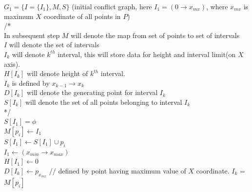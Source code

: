 \documentclass[a4paper]{article}
\begin{document}
\begin{algorithm}[H]
\SetAlgoLined
{}
  $G_1 = \{ I = \{ I_1 \}, M, S \}$ (initial conflict graph, here $I_1 = (0\rightarrow x_{mx})$, where $x_{mx}$ is maximum $X$ coordinate of all points in $P$) \\
  /* \\
  In subsequent step $M$ will denote the map from set of points to set of intervals \\
  $I$ will denote the set of intervals \\
  $I_k$ will denote $k^{th}$ interval, this will store data for height and interval limit(on $X$ axis).\\
  $H[I_k]$ will denote height of $k^{th}$ interval.\\
  $I_k$ is defined by $x_{k-1} \rightarrow x_k$\\
  $D[I_k]$ will denote the generating point for interval $I_k$ \\
  $S[I_k]$ will denote the set of all points belonging to interval $I_k$ \\
  */ \\
  $S[I_1] = \phi$ \\
   {
  	$M[p_i] \leftarrow I_1$\\
    $S[I_1] \leftarrow S[I_1] \cup {p_i}$ \\
  }
  $I_1 \leftarrow (x_{min}\rightarrow x_{max})$ \\
  $H[I_1] \leftarrow 0$\\
  $D[I_k] \leftarrow p_{x_{mx}}$ // defined by point having maximum value of $X$ coordinate.
  {
 	$I_k$ = $M[p_i]$ \\
 	}
\end{algorithm}
\end{document}
